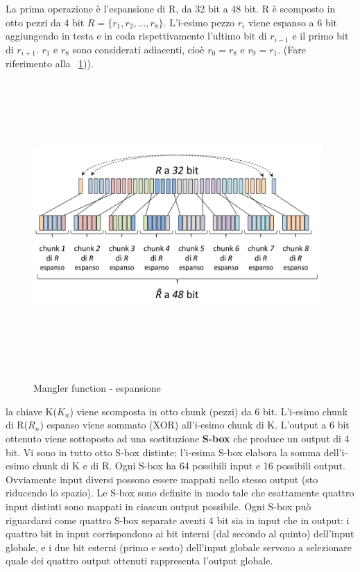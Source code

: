 La prima operazione è l’espansione di R, da 32 bit a 48 bit. R è scomposto in otto pezzi da 4 bit $R = \lbrace r_{1} , r_{2}, ..., r_{8} \rbrace$. L’i-esimo pezzo $r_{i}$ viene espanso a 6 bit aggiungendo in testa e in coda rispettivamente l’ultimo bit di $r_{i-1}$ e il primo bit di $r_{i+1}$. $r_{1}$ e $r_{8}$ sono considerati adiacenti, cioè $r_{0} = r_{8}$ e $r_{9} = r_{1}$. (Fare riferimento alla \figurename ~\ref{fig:mangler_exp})).
\begin{figure}[htbp]
	\centering%
	\subfigure%
	{\includegraphics[height=11cm, width=11cm, keepaspectratio]{Immagini/Capitolo2/mangler_exp.png}}
	\caption{Mangler function - espansione \label{fig:mangler_exp}} 	
\end{figure}
\newline
la chiave K($K_{n}$) viene scomposta in otto chunk (pezzi) da 6 bit. L'i-esimo chunk di R($R_{n}$) espanso viene sommato (XOR) all’i-esimo chunk di K. L'output a 6 bit ottenuto viene sottoposto ad una sostituzione \textbf{S-box} che produce un output di 4 bit. Vi sono in tutto otto S-box distinte; l’i-esima S-box elabora la somma dell’i-esimo chunk di K e di R. Ogni S-box ha 64 possibili input e 16 possibili output. Ovviamente input diversi possono essere mappati nello stesso output (sto riducendo lo spazio). Le S-box sono definite in modo tale che esattamente quattro
input distinti sono mappati in ciascun output possibile. Ogni S-box può riguardarsi come quattro S-box separate aventi 4 bit sia in input che in output: i quattro bit in input corrispondono ai bit interni (dal secondo al quinto) dell'input globale, e i due bit esterni (primo e sesto) dell’input globale servono a selezionare quale dei quattro output ottenuti rappresenta l'output globale.
